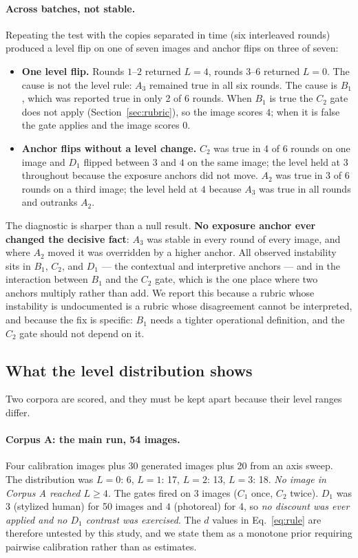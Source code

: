\documentclass[11pt]{article}
\begin{document}
\paragraph{Across batches, not stable.} Repeating the test with the copies separated in time (six interleaved rounds) produced a level flip on one of seven images and anchor flips on three of seven:
\begin{itemize}\itemsep1pt
\item \textbf{One level flip.} Rounds $1$--$2$ returned $L=4$, rounds $3$--$6$ returned $L=0$. The cause is not the level rule: $A_3$ remained true in all six rounds. The cause is $B_1$, which was reported true in only 2 of 6 rounds. When $B_1$ is true the $C_2$ gate does not apply (Section~\ref{sec:rubric}), so the image scores $4$; when it is false the gate applies and the image scores $0$.
\item \textbf{Anchor flips without a level change.} $C_2$ was true in 4 of 6 rounds on one image and $D_1$ flipped between $3$ and $4$ on the same image; the level held at $3$ throughout because the exposure anchors did not move. $A_2$ was true in 3 of 6 rounds on a third image; the level held at $4$ because $A_3$ was true in all rounds and outranks $A_2$.
\end{itemize}
The diagnostic is sharper than a null result. \textbf{No exposure anchor ever changed the decisive fact}: $A_3$ was stable in every round of every image, and where $A_2$ moved it was overridden by a higher anchor. All observed instability sits in $B_1$, $C_2$, and $D_1$ --- the contextual and interpretive anchors --- and in the interaction between $B_1$ and the $C_2$ gate, which is the one place where two anchors multiply rather than add. We report this because a rubric whose instability is undocumented is a rubric whose disagreement cannot be interpreted, and because the fix is specific: $B_1$ needs a tighter operational definition, and the $C_2$ gate should not depend on it.

\subsection{What the level distribution shows}
Two corpora are scored, and they must be kept apart because their level ranges differ.

\paragraph{Corpus A: the main run, 54 images.} Four calibration images plus 30 generated images plus 20 from an axis sweep. The distribution was $L{=}0$: 6, $L{=}1$: 17, $L{=}2$: 13, $L{=}3$: 18. \emph{No image in Corpus A reached $L\ge4$.} The gates fired on 3 images ($C_1$ once, $C_2$ twice). $D_1$ was $3$ (stylized human) for 50 images and $4$ (photoreal) for 4, so \emph{no discount was ever applied and no $D_1$ contrast was exercised}. The $d$ values in Eq.~\ref{eq:rule} are therefore untested by this study, and we state them as a monotone prior requiring pairwise calibration rather than as estimates.
\end{document}
